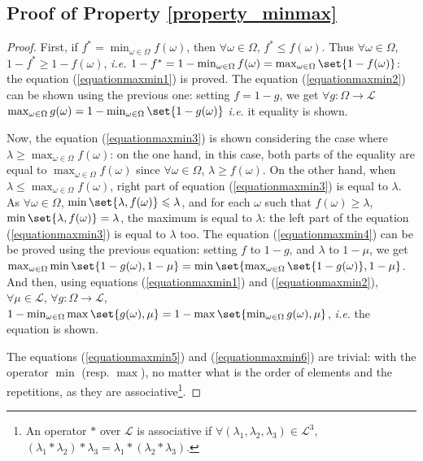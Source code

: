 \subsection{Proof of Property \ref{property_minmax}}
\label{property_minmax_RETURN}
\begin{proof}
First, if $f^* = \min_{\omega \in \Omega} f(\omega) $,
then $\forall \omega \in \Omega$, $f^* \leqslant f(\omega)$.
Thus $\forall \omega \in \Omega$, $1-f^* \geqslant 1-f(\omega)$, \textit{i.e.}
$1-f^* = 1-\min_{\omega \in \Omega} f(\omega) = \max_{\omega \in \Omega} \set{ 1-f(\omega) }$:
the equation (\ref{equationmaxmin1}) is proved.
The equation (\ref{equationmaxmin2}) can be shown using the previous one: 
setting $f = 1-g$, we get $\forall g: \Omega \rightarrow \mathcal{L}$ 
$\max_{\omega \in \Omega} g(\omega) = 1 - \min_{\omega \in \Omega} \set{ 1 - g(\omega) }$
\textit{i.e.} it equality is shown.

Now, the equation (\ref{equationmaxmin3}) is shown 
considering the case where $\lambda \geqslant \max_{\omega \in \Omega} f(\omega)$:
on the one hand, in this case, both parts of the equality are equal to $\max_{\omega \in \Omega} f(\omega) $
since $\forall \omega \in \Omega$, $\lambda \geqslant f(\omega)$.
On the other hand, when $\lambda \leqslant \max_{\omega \in \Omega} f(\omega)$, 
right part of equation (\ref{equationmaxmin3}) is equal to $\lambda$. 
As $\forall \omega \in \Omega$, $\min \set{ \lambda, f(\omega) } \leqslant \lambda$,
and for each $\omega$ such that $f(\omega) \geqslant \lambda$, $\min \set{ \lambda, f(\omega) } = \lambda$, 
the maximum is equal to $\lambda$: the left part of the equation (\ref{equationmaxmin3}) is equal to $\lambda$ too. 
The equation (\ref{equationmaxmin4}) can be be proved using the previous equation:
setting $f$ to $1-g$, and $\lambda$ to $1 - \mu$, we get
$\max_{\omega \in \Omega} \min \set{ 1 - g(\omega), 1 - \mu } = \min \set{ \max_{\omega \in \Omega} \set{1 - g(\omega)}, 1 - \mu }$.
And then, using equations (\ref{equationmaxmin1}) and (\ref{equationmaxmin2}), 
$\forall \mu \in \mathcal{L}$, $\forall g:\Omega \rightarrow \mathcal{L}$,
$1 - \min_{\omega \in \Omega} \max \set{ g(\omega), \mu } = 1 - \max \set{ \min_{\omega \in \Omega} g(\omega), \mu }$,
\textit{i.e.} the equation is shown.

The equations (\ref{equationmaxmin5}) and (\ref{equationmaxmin6})
are trivial: with the operator $\min$ (resp. $\max$), 
no matter what is the order of elements and the repetitions,
as they are associative\footnote{ An operator $*$ over $\mathcal{L}$ is associative if $\forall (\lambda_1,\lambda_2,\lambda_3) \in \mathcal{L}^3$, $(\lambda_1 * \lambda_2) * \lambda_3 = \lambda_1 * (\lambda_2 * \lambda_3)$.}.


\end{proof}
